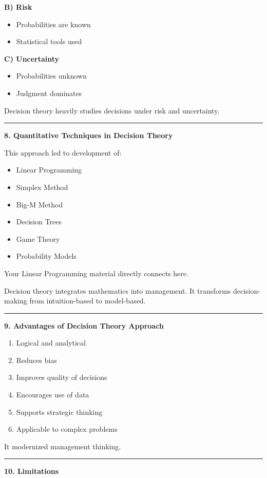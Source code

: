 \documentclass[10pt,a4paper]{article}
\newcommand{\separator}{\vspace{0.4em}\noindent\rule{\linewidth}{0.6pt}\vspace{0.4em}}
\begin{document}
\textbf{B) Risk}
\begin{itemize}
  \item Probabilities are known
  \item Statistical tools used
\end{itemize}

\textbf{C) Uncertainty}
\begin{itemize}
  \item Probabilities unknown
  \item Judgment dominates
\end{itemize}

Decision theory heavily studies decisions under risk and uncertainty.

\separator

\textbf{8. Quantitative Techniques in Decision Theory}

This approach led to development of:
\begin{itemize}
  \item Linear Programming
  \item Simplex Method
  \item Big-M Method
  \item Decision Trees
  \item Game Theory
  \item Probability Models
\end{itemize}

Your Linear Programming material directly connects here.

Decision theory integrates mathematics into management.
It transforms decision-making from intuition-based to model-based.

\separator

\textbf{9. Advantages of Decision Theory Approach}

\begin{enumerate}
  \item Logical and analytical
  \item Reduces bias
  \item Improves quality of decisions
  \item Encourages use of data
  \item Supports strategic thinking
  \item Applicable to complex problems
\end{enumerate}

It modernized management thinking.

\separator

\textbf{10. Limitations}
\end{document}
